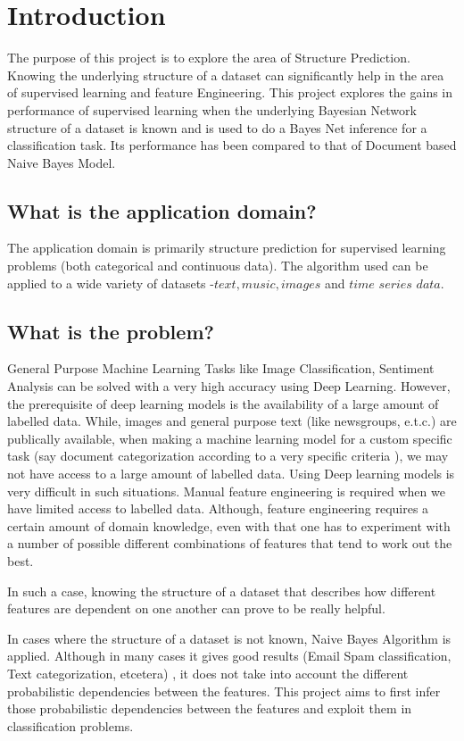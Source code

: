 \section{Introduction}

The purpose of this project is to explore the area of Structure Prediction. Knowing the underlying structure  of a dataset can significantly help in the area of supervised learning and feature Engineering. This project explores the gains in performance of supervised learning when the underlying Bayesian Network structure of a dataset is known and is used to do a Bayes Net inference for a classification task. Its performance has been compared to that of Document based Naive Bayes Model.

\subsection{What is the application domain?}

The application domain is primarily structure prediction for supervised learning problems (both categorical and continuous data). The algorithm used can be applied to a wide variety of datasets -$text,music,images$ and $time$ $series$ $data$.

\subsection{What is the problem?}

General Purpose Machine Learning Tasks like Image Classification, Sentiment Analysis can be solved with a very high accuracy using Deep Learning. However, the prerequisite of deep learning models is the availability of a large amount of labelled data. While, images and general purpose text (like newsgroups, e.t.c.) are publically available, when making a machine learning model for a custom specific task (say document categorization according to a very specific criteria ), we may not have access to a large amount of labelled data.
Using Deep learning models is very difficult in such situations. Manual feature engineering is required when we have limited access to labelled data. Although, feature  engineering requires a certain amount of domain knowledge, even with that one has to experiment with a number of possible different combinations of features that tend to work out the best.

In such a case, knowing the structure of a dataset that describes how different features are dependent on one another can prove to be really helpful.

In cases where the structure of a dataset is not known, Naive Bayes Algorithm is applied. Although in many cases it gives good results (Email Spam classification, Text categorization, etcetera) , it does not take into account the different probabilistic dependencies between the features.
This project aims to first infer those probabilistic dependencies between the features and exploit them in classification problems.

\vspace{60.6pt}




